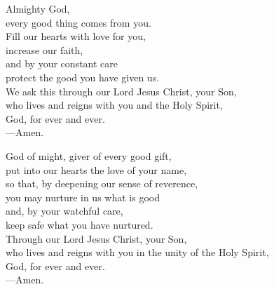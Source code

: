 \prayer


\begin{prayerverse}
Almighty God,\\
every good thing comes from you.\\
Fill our hearts with love for you,\\
increase our faith,\\
and by your constant care\\
protect the good you have given us.\\
We ask this through our Lord Jesus Christ, your Son,\\
who lives and reigns with you and the Holy Spirit,\\
God, for ever and ever.\\
{\color{red}---\thinspace}Amen.
\end{prayerverse}


\begin{prayerverse}
God of might, giver of every good gift,\\
put into our hearts the love of your name,\\
so that, by deepening our sense of reverence,\\
you may nurture in us what is good\\
and, by your watchful care,\\
keep safe what you have nurtured.\\
Through our Lord Jesus Christ, your Son,\\
who lives and reigns with you in the unity of the Holy Spirit,\\
God, for ever and ever.\\
{\color{red}---\thinspace}Amen.
\end{prayerverse}

